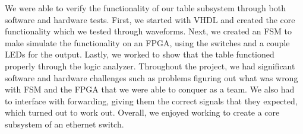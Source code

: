 \documentclass{article}
\begin{document}
We were able to verify the functionality of our table subsystem through both software and hardware tests. First, we started with VHDL and created the core functionality which we tested through waveforms. Next, we created an FSM to make simulate the functionality on an FPGA, using the switches and a couple LEDs for the output. Lastly, we worked to show that the table functioned properly through the logic analyzer. Throughout the project, we had significant software and hardware challenges such as problems figuring out what was wrong with FSM and the FPGA that we were able to conquer as a team. We also had to interface with forwarding, giving them the correct signals that they expected, which turned out to work out. Overall, we enjoyed working to create a core subsystem of an ethernet switch.
\end{document}
